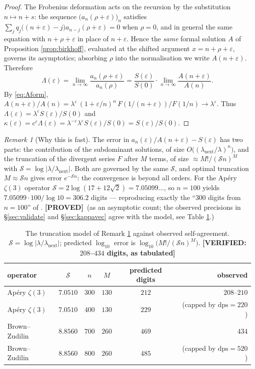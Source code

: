\documentclass[11pt,reqno]{amsart}
\theoremstyle{plain}
\theoremstyle{definition}
\theoremstyle{remark}
\newtheorem{remark}[theorem]{Remark}
\newcommand{\PROVED}{{\normalfont\sffamily\bfseries[PROVED]}}
\newcommand{\VER}[1]{{\normalfont\sffamily\bfseries[VERIFIED: #1]}}
\newcommand{\eps}{\varepsilon}
\newcommand{\dps}{\mathrm{dps}}
\begin{document}
\begin{proof}
The Frobenius deformation acts on the recursion by the substitution $n\mapsto n+s$: the sequence
$\bigl(a_n(\rho+\eps)\bigr)_n$ satisfies $\sum_j q_j\bigl((n+\eps)-j\bigr)a_{n-j}(\rho+\eps)=0$
when $\rho=0$, and in general the same equation with $n+\rho+\eps$ in place of $n+\eps$. Hence
the \emph{same} formal solution $A$ of Proposition \ref{prop:birkhoff}, evaluated at the shifted
argument $x=n+\rho+\eps$, governs its asymptotics; absorbing $\rho$ into the normalisation we
write $A(n+\eps)$. Therefore
\[
  \Lambda(\eps)=\lim_{n\to\infty}\frac{a_n(\rho+\eps)}{a_n(\rho)}
  =\frac{S(\eps)}{S(0)}\cdot\lim_{n\to\infty}\frac{A(n+\eps)}{A(n)} .
\]
By \eqref{eq:Aform},
$A(n+\eps)/A(n)=\lambda^{\eps}\,(1+\eps/n)^{\alpha}\,F(1/(n+\eps))/F(1/n)\to\lambda^{\eps}$.
Thus $\Lambda(\eps)=\lambda^{\eps}S(\eps)/S(0)$ and
$\kappa(\eps)=c^{\eps}\Lambda(\eps)=\lambda^{-\eps}\lambda^{\eps}S(\eps)/S(0)=S(\eps)/S(0)$.
\end{proof}

\begin{remark}[Why this is fast]\label{rem:fast}
The error in $a_n(\eps)/A(n+\eps)-S(\eps)$ has two parts: the contribution of the subdominant
solutions, of size $O\bigl((\lambda_{\mathrm{next}}/\lambda)^{n}\bigr)$, and the truncation of
the divergent series $F$ after $M$ terms, of size $\approx M!/(\mathcal S n)^{M}$ with
$\mathcal S=\log|\lambda/\lambda_{\mathrm{next}}|$. Both are governed by the same $\mathcal S$,
and optimal truncation $M\approx \mathcal S n$ gives error $e^{-\mathcal S n}$: the convergence
is beyond all orders. For the Ap\'ery $\zeta(3)$ operator
$\mathcal S=2\log(17+12\sqrt2)=7.05099\ldots$, so $n=100$ yields
$7.05099\cdot 100/\log 10=306.2$ digits --- reproducing exactly the ``$300$ digits from
$n=100$'' of \cite[\S9]{GZ1}. \PROVED\ (as an asymptotic count; the observed precisions in
\S\ref{sec:validate} and \S\ref{sec:kappavec} agree with the model, see Table \ref{tab:precision}.)
\end{remark}

\begin{table}[t]
\centering
\caption{The truncation model of Remark \ref{rem:fast} against observed self-agreement.
$\mathcal S=\log|\lambda/\lambda_{\mathrm{next}}|$; predicted $\log_{10}$ error is
$\log_{10}\bigl(M!/(\mathcal S n)^{M}\bigr)$. \VER{$208$--$434$ digits, as tabulated}}
\label{tab:precision}
\begin{tabular}{lccccr}
\toprule
operator & $\mathcal S$ & $n$ & $M$ & predicted digits & observed \\
\midrule
Ap\'ery $\zeta(3)$ & $7.0510$ & $300$ & $130$ & $212$ & $208$--$210$ \\
Ap\'ery $\zeta(3)$ & $7.0510$ & $400$ & $130$ & $229$ & (capped by $\dps=220$) \\
Brown--Zudilin     & $8.8560$ & $700$ & $260$ & $469$ & $434$ \\
Brown--Zudilin     & $8.8560$ & $800$ & $260$ & $485$ & (capped by $\dps=520$) \\
\bottomrule
\end{tabular}
\end{table}
\end{document}
